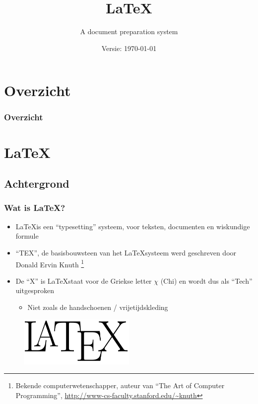 \documentclass{beamer}
\title[]{\LaTeX}
\subtitle{A document preparation system}
\author{}
\institute{Jeroen Doggen \\ jeroen.doggen@artesis.be}
\date{Versie: \today}
\begin{document}
\maketitle

\section*{Overzicht}
\begin{frame}
\frametitle{Overzicht}
\tableofcontents
\end{frame}

\section{\LaTeX}
\subsection{Achtergrond}

\begin{frame}
\frametitle{Wat is \LaTeX?}
\begin{itemize}[<+->]
 \item \LaTeX is een ``typesetting'' systeem, voor teksten, documenten en wiskundige formule
 \item ``TEX'', de basisbouwsteen van het \LaTeX systeem werd geschreven door Donald Ervin Knuth \footnote{Bekende computerwetenschapper, auteur van ``The Art of Computer Programming'', \url{http://www-cs-faculty.stanford.edu/~knuth}}
 \item  De ``X'' is \LaTeX staat voor de Griekse letter $\chi$ (Chi) en wordt dus als ``Tech'' uitgesproken
 \begin{itemize}
  \item Niet zoals de handschoenen / vrijetijdskleding
  \end{itemize}

\end{itemize}
\begin{figure}[h] 
  \includegraphics[width=0.5\textwidth]{images/latex.png}
\end{figure}
\end{frame}
\end{document}
